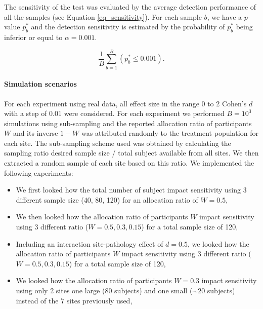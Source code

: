 \documentclass[authoryear]{elsarticle}
\begin{document}
The sensitivity of the test was evaluated by the average detection performance of all the samples (see Equation \ref{eq_sensitivity}). For each sample $b$, we have a $p$-value $p^{*}_b$ and the detection sensitivity is estimated by the probability of $p^{*}_b$ being inferior or equal to $\alpha=0.001$.

\begin{equation}
   \frac{1}{B}\sum\limits_{b=1}^B\left(p^{*}_b\leq0.001\right).
   \label{eq_sensitivity}
\end{equation}


\paragraph{Simulation scenarios}
For each experiment using real data, all effect size in the range 0 to 2 Cohen’s $d$ with a step of 0.01 were considered. For each experiment we performed $B=10^3$ simulations using sub-sampling and the reported allocation ratio of participants $W$ and its inverse $1-W$ was attributed randomly to the treatment population for each site. The sub-sampling scheme used was obtained by calculating the sampling ratio desired sample size / total subject available from all sites. We then extracted a random sample of each site based on this ratio. We implemented the following experiments:

\begin{itemize}
 \item We first looked how the total number of subject impact sensitivity using 3 different sample size (40, 80, 120) for an allocation ratio of $W=0.5$,
 \item We then looked how the allocation ratio of participants $W$ impact sensitivity using 3 different ratio ($W=0.5,0.3,0.15$) for a total sample size of 120,
 \item Including an interaction site-pathology effect of $d=0.5$, we looked how the allocation ratio of participants $W$ impact sensitivity using 3 different ratio ($W=0.5,0.3,0.15$) for a total sample size of 120,
 \item We looked how the allocation ratio of participants $W=0.3$ impact sensitivity using only 2 sites one large (80 subjects) and one small ($\sim20$ subjects) instead of the 7 sites previously used,
\end{itemize}
\end{document}
